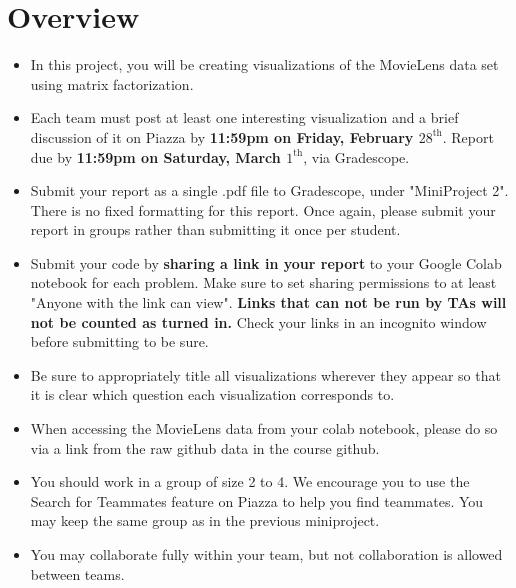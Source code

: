 \newif\ifshowsolutions
\showsolutionstrue





\pagestyle{fancy}

\section{Overview}
\begin{itemize}
	\item In this project, you will be creating visualizations of the MovieLens data set using matrix factorization.
	\item Each team must post at least one interesting visualization and a brief discussion of it on Piazza by \textbf{11:59pm on Friday, February $28^{\text{th}}$}. Report due by \textbf{11:59pm on Saturday, March $1^{\text{th}}$}, via Gradescope.   
	\item Submit your report as a single .pdf file to Gradescope, under "MiniProject 2". There is no fixed formatting for this report. Once again, please submit your report in groups rather than submitting it once per student.
	 \item Submit your code by \textbf{sharing a link in your report} to your Google Colab notebook for each problem. Make sure to set sharing permissions to at least "Anyone with the link can view". \textbf{Links that can not be run by TAs will not be counted as turned in.} Check your links in an incognito window before submitting to be sure.
    \item Be sure to appropriately title all visualizations wherever they appear so that it is clear which question each visualization corresponds to.
    \item When accessing the MovieLens data from your colab notebook, please do so via a link from the raw github data in the course github.
	\item You should work in a group of size 2 to 4. We encourage you to use the Search for Teammates feature on Piazza to help you find teammates. You may keep the same group as in the previous miniproject.
	\item You may collaborate fully within your team, but not collaboration is allowed between teams.
\end{itemize}

